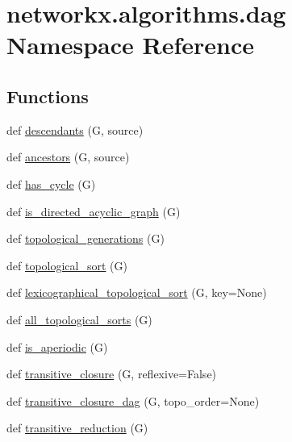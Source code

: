 \hypertarget{namespacenetworkx_1_1algorithms_1_1dag}{}\section{networkx.\+algorithms.\+dag Namespace Reference}
\label{namespacenetworkx_1_1algorithms_1_1dag}
\subsection*{Functions}
\begin{DoxyCompactItemize}
\item 
def \hyperlink{namespacenetworkx_1_1algorithms_1_1dag_ad83d7e1164190f67e4f648e8bb0d1df8}{descendants} (G, source)
\item 
def \hyperlink{namespacenetworkx_1_1algorithms_1_1dag_ab5931c11c1d779c650c90cb1594f738e}{ancestors} (G, source)
\item 
def \hyperlink{namespacenetworkx_1_1algorithms_1_1dag_a92320d5ff79b60e340b1b386a71b5b33}{has\+\_\+cycle} (G)
\item 
def \hyperlink{namespacenetworkx_1_1algorithms_1_1dag_a282871f30feeb5981563367cb9800007}{is\+\_\+directed\+\_\+acyclic\+\_\+graph} (G)
\item 
def \hyperlink{namespacenetworkx_1_1algorithms_1_1dag_a90baa3a72db8f7a1da7098d87c7e64b4}{topological\+\_\+generations} (G)
\item 
def \hyperlink{namespacenetworkx_1_1algorithms_1_1dag_ab21f66ba4608c33f0e992f552694bd6d}{topological\+\_\+sort} (G)
\item 
def \hyperlink{namespacenetworkx_1_1algorithms_1_1dag_a718a056e7a26627ee5bd12d1db32e0be}{lexicographical\+\_\+topological\+\_\+sort} (G, key=None)
\item 
def \hyperlink{namespacenetworkx_1_1algorithms_1_1dag_a074659844f762889735522a3da549efa}{all\+\_\+topological\+\_\+sorts} (G)
\item 
def \hyperlink{namespacenetworkx_1_1algorithms_1_1dag_a4ecc4e0b39707797a07ead610a9ecdf7}{is\+\_\+aperiodic} (G)
\item 
def \hyperlink{namespacenetworkx_1_1algorithms_1_1dag_a004f6e48d82f3d56b5e5c906da0986d9}{transitive\+\_\+closure} (G, reflexive=False)
\item 
def \hyperlink{namespacenetworkx_1_1algorithms_1_1dag_a461cd43df92c1a7dcb7e5605d750801f}{transitive\+\_\+closure\+\_\+dag} (G, topo\+\_\+order=None)
\item 
def \hyperlink{namespacenetworkx_1_1algorithms_1_1dag_ad4c177fd8eccf2503a153ddc6f73a8c2}{transitive\+\_\+reduction} (G)

\end{DoxyCompactItemize}

